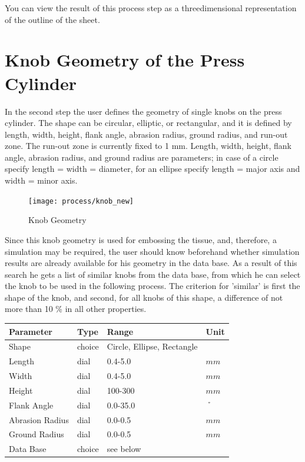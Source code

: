 You can view the result of this process step as a threedimensional 
representation of the outline of the sheet.


\section{Knob Geometry of the Press Cylinder}

In the second step the user defines the geometry of single knobs on the press 
cylinder. The shape can be circular, elliptic, or rectangular, and it is 
defined by length, width, height, flank angle, abrasion radius, ground radius, and run-out zone.
The run-out zone is currently fixed to 1 mm. Length, width, height, flank angle, abrasion radius, 
and ground radius are parameters; in case of a circle specify length = width = diameter, 
for an ellipse specify length = major axis and width = minor axis. 


\begin{figure}[!Hhtp]
  \begin{center}
   \texttt{[image: process/knob\_new]}
   \caption{Knob Geometry}
  \end{center}
\end{figure}

Since this knob geometry is used for embossing the tissue, and, therefore, 
a simulation may be required, the user should know beforehand whether simulation 
results are already available for his geometry in the data base.  
As a result of this search he gets a list of similar knobs from the data 
base, from which he can select the knob to be used in the following process. 
The criterion for 'similar' is first the shape of the knob, and second, 
for all knobs of this shape, a difference of not more than 10 \% in all 
other properties.

\vspace{0.5cm}
\begin{tabular}{|l|l|l|l|} \hline
Parameter 			& Type 		& Range 	& Unit	\\ \hline
Shape 				& choice 	& Circle, Ellipse, Rectangle			& 			\\ \hline
Length  	        & dial & 0.4-5.0		& $mm$ 		\\ \hline
Width	            	& dial & 0.4-5.0		& $mm$ 		\\ \hline
Height			& dial	& 100-300 	& $mm$ 	\\ \hline
Flank Angle		& dial	& 0.0-35.0 	& $\symbol{23}$ \\ \hline
Abrasion Radius	& dial	& 0.0-0.5 		& $mm$ 		\\ \hline
Ground Radius	& dial	& 0.0-0.5 		& $mm$ 		\\ \hline
Data Base 		& choice	& see below   &			\\ \hline
\end{tabular}
\vspace{0.5cm}

